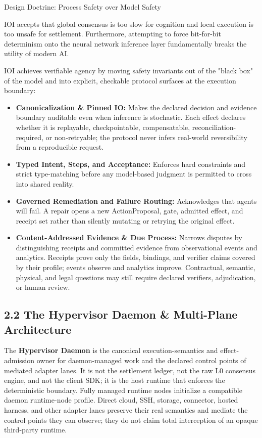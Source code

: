 \documentclass[
  11pt,
]{article}
\providecommand{\tightlist}{%
  \setlength{\itemsep}{0pt}\setlength{\parskip}{0pt}}
\begin{document}
Design Doctrine: Process Safety over Model Safety

IOI accepts that global consensus is too slow for cognition and local
execution is too unsafe for settlement. Furthermore, attempting to force
bit-for-bit determinism onto the neural network inference layer
fundamentally breaks the utility of modern AI.

IOI achieves verifiable agency by moving safety invariants out of the
"black box" of the model and into explicit, checkable protocol surfaces
at the execution boundary:

\begin{itemize}
\tightlist
\item
  \textbf{Canonicalization \& Pinned IO:} Makes the declared decision and
  evidence boundary auditable even when inference is stochastic. Each effect
  declares whether it is replayable, checkpointable, compensatable,
  reconciliation-required, or non-retryable; the protocol never infers
  real-world reversibility from a reproducible request.
\item
  \textbf{Typed Intent, Steps, and Acceptance:} Enforces hard
  constraints and strict type-matching before any model-based judgment
  is permitted to cross into shared reality.
\item
  \textbf{Governed Remediation and Failure Routing:} Acknowledges that
  agents will fail. A repair opens a new ActionProposal, gate, admitted
  effect, and receipt set rather than silently mutating or retrying the
  original effect.
\item
  \textbf{Content-Addressed Evidence \& Due Process:} Narrows disputes by
  distinguishing receipts and committed evidence from observational events
  and analytics. Receipts prove only the fields, bindings, and verifier claims
  covered by their profile; events observe and analytics improve. Contractual,
  semantic, physical, and legal questions may still require declared
  verifiers, adjudication, or human review.
\end{itemize}

\hypertarget{the-hypervisor-daemon-multi-plane-architecture}{%
\subsection{2.2 The Hypervisor Daemon \& Multi-Plane
Architecture}\label{the-hypervisor-daemon-multi-plane-architecture}}

The \textbf{Hypervisor Daemon} is the canonical execution-semantics and
effect-admission owner for daemon-managed work and the declared control points
of mediated adapter lanes.
It is not the settlement ledger, not the raw L0 consensus engine, and
not the client SDK; it is the host runtime that enforces the
deterministic boundary. Fully managed runtime nodes initialize a compatible
daemon runtime-node profile. Direct cloud, SSH, storage, connector, hosted
harness, and other adapter lanes preserve their real semantics and mediate the
control points they can observe; they do not claim total interception of an
opaque third-party runtime.
\end{document}
